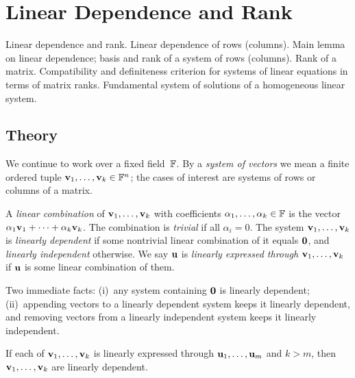 
\section{Linear Dependence and Rank}
\label{sec:1.1.02-rank}

\begin{ticket}
Linear dependence and rank. Linear dependence of rows (columns). Main lemma on linear dependence; basis and rank of a system of rows (columns). Rank of a matrix. Compatibility and definiteness criterion for systems of linear equations in terms of matrix ranks. Fundamental system of solutions of a homogeneous linear system.
\end{ticket}

\subsection*{Theory}

We continue to work over a fixed field~$\mathbb{F}$. By a \emph{system of vectors}
we mean a finite ordered tuple $\mathbf{v}_1, \dots, \mathbf{v}_k \in \mathbb{F}^n$;
the cases of interest are systems of rows or columns of a matrix.

\begin{definition}
\label{def:lin-dep}
A \emph{linear combination} of $\mathbf{v}_1, \dots, \mathbf{v}_k$ with
coefficients $\alpha_1, \dots, \alpha_k \in \mathbb{F}$ is the vector
$\alpha_1 \mathbf{v}_1 + \dots + \alpha_k \mathbf{v}_k$. The combination is
\emph{trivial} if all $\alpha_i = 0$. The system
$\mathbf{v}_1, \dots, \mathbf{v}_k$ is \emph{linearly dependent} if some
nontrivial linear combination of it equals $\mathbf{0}$, and
\emph{linearly independent} otherwise. We say $\mathbf{u}$ is
\emph{linearly expressed through} $\mathbf{v}_1, \dots, \mathbf{v}_k$
if $\mathbf{u}$ is some linear combination of them.
\end{definition}

\begin{remark}
\label{rem:basic-dep-facts}
Two immediate facts: (i)~any system containing $\mathbf{0}$ is linearly
dependent; (ii)~appending vectors to a linearly dependent system keeps
it linearly dependent, and removing vectors from a linearly independent
system keeps it linearly independent.
\end{remark}

\begin{theorem}
\label{thm:main-lemma}
If each of $\mathbf{v}_1, \dots, \mathbf{v}_k$ is linearly expressed through
$\mathbf{u}_1, \dots, \mathbf{u}_m$ and $k > m$, then
$\mathbf{v}_1, \dots, \mathbf{v}_k$ are linearly dependent.
\end{theorem}

